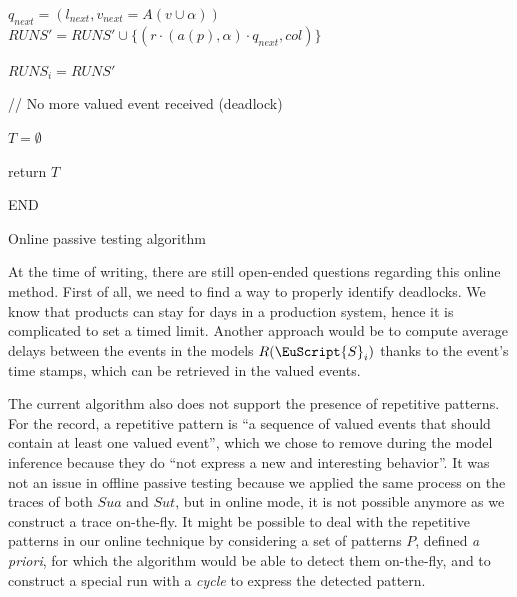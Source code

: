 \begin{algorithm}[h]
{{{{{{                            $q_{next} = (l_{next}, v_{next} = A(v \cup \alpha))$\;
                            $RUNS' = RUNS' \cup \{ (r \cdot (a(p), \alpha) \cdot q_{next}, col) \}$\;
                        }%

                    }%

                }%

            }%

            $RUNS_i = RUNS'$\;\label{algo:check-online:line:runs-i-up}
        }%


    }%

    \BlankLine
    // No more valued event received (deadlock)
    \BlankLine

    $T = \emptyset$\;

    return $T$\;

    \BlankLine
    END\;

    \caption{Online passive testing algorithm}
    \label{algo:check-online}
\end{algorithm}

\clearpage

At the time of writing, there are still open-ended questions
regarding this online method. First of all, we need to find a way
to properly identify deadlocks. We know that products can stay
for days in a production system, hence it is complicated to set a
timed limit. Another approach would be to compute average delays
between the events in the models $R(\EuScript{S}_i)$ thanks to
the event's time stamps, which can be retrieved in the valued
events.

The current algorithm also does not support the presence of
repetitive patterns. For the record, a repetitive pattern is
\enquote{a sequence of valued events that should contain at least
one valued event}, which we chose to remove during the model
inference because they do \enquote{not express a new and
interesting behavior}. It was not an issue in offline passive
testing because we applied the same process on the traces of both
$\mathit{Sua}$ and $\mathit{Sut}$, but in online mode, it is not
possible anymore as we construct a trace on-the-fly. It might be
possible to deal with the repetitive patterns in our online
technique by considering a set of patterns $P$, defined \emph{a
priori}, for which the algorithm would be able to detect them
on-the-fly, and to construct a special run with a \emph{cycle} to
express the detected pattern.


